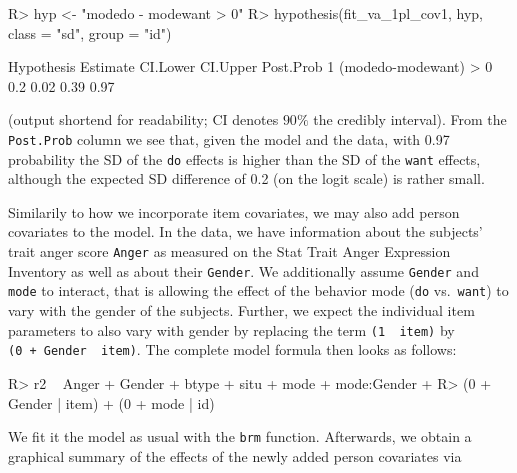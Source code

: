 \documentclass[jss]{jss}
\begin{document}
\begin{CodeChunk}

\begin{CodeInput}
R> hyp <- "modedo - modewant > 0"
R> hypothesis(fit_va_1pl_cov1, hyp, class = "sd", group = "id")
\end{CodeInput}
\end{CodeChunk}

\begin{CodeChunk}

\begin{CodeOutput}
             Hypothesis Estimate CI.Lower CI.Upper Post.Prob
1 (modedo-modewant) > 0      0.2     0.02     0.39      0.97
\end{CodeOutput}
\end{CodeChunk}

(output shortend for readability; CI denotes \(90\%\) the credibly
interval). From the \texttt{Post.Prob} column we see that, given the
model and the data, with 0.97 probability the SD of the \texttt{do}
effects is higher than the SD of the \texttt{want} effects, although the
expected SD difference of 0.2 (on the logit scale) is rather small.

Similarily to how we incorporate item covariates, we may also add person
covariates to the model. In the  data, we have information
about the subjects' trait anger score \texttt{Anger} as measured on the
Stat Trait Anger Expression Inventory \citep[STAXI;][]{spielberger2010}
as well as about their \texttt{Gender}. We additionally assume
\texttt{Gender} and \texttt{mode} to interact, that is allowing the
effect of the behavior mode (\texttt{do} vs.~\texttt{want}) to vary with
the gender of the subjects. Further, we expect the individual item
parameters to also vary with gender by replacing the term
\texttt{(1\ \textbar{}\ item)} by
\texttt{(0\ +\ Gender\ \textbar{}\ item)}. The complete model formula
then looks as follows:

\begin{CodeChunk}

\begin{CodeInput}
R> r2 ~ Anger + Gender + btype + situ + mode + mode:Gender +
R>   (0 + Gender | item) + (0 + mode | id)
\end{CodeInput}
\end{CodeChunk}

We fit it the model as usual with the \texttt{brm} function. Afterwards,
we obtain a graphical summary of the effects of the newly added person
covariates via
\end{document}
